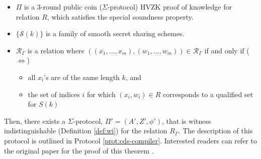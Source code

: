 \begin{itemize}
    \item $\Pi$ is a 3-round public coin ($\Sigma$-protocol) HVZK proof of knowledge for relation $R$, which satisfies the special soundness property.
    \item $\{\mathcal S(k)\}$ is a family of smooth secret sharing schemes.
    \item $\mathcal R_\Gamma$ is a relation where $((x_1,\ldots,x_m),(w_1,\ldots,w_m)) \in \mathcal R_\Gamma$ if and only if ($\iff$)
    \begin{itemize}
        \item all $x_i$'s are of the same length $k$, and 
        \item the set of indices $i$ for which $(x_i,w_i) \in R$ corresponds to a qualified set for $S(k)$
    \end{itemize}
\end{itemize}

Then, there exists a $\Sigma$-protocol, $\Pi' = (A', Z', \phi')$, that is witness indistinguishable (Definition \ref{def:wi}) for the relation $R_\Gamma$. The description of this protocol is outlined in Protocol \ref{prot:cds-compiler}. Interested readers can refer to the original paper for the proof of this theorem \cite{CDS94}. 

